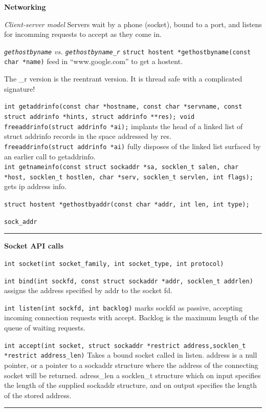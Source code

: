 \documentclass{article}
\begin{document}
\begin{multicols}{2}
  {\bf Networking}

  {\it Client-server model} Servers wait by a phone (socket), bound to a port,
  and listens for incomming requests to accept as they come in.

  {\it {\tt gethostbyname} vs. {\tt gethostbyname\_r}}
  {\tt struct hostent *gethostbyname(const char *name)} feed in
  ``www.google.com'' to get a hostent.

  The \_r version is the reentrant version. It is thread safe with a complicated
  signature!

  {\tt int getaddrinfo(const char *hostname, const char *servname,
  const struct addrinfo *hints, struct addrinfo **res);
  void freeaddrinfo(struct addrinfo *ai);} implants the head of a
  linked list of struct addrinfo records in the space addressed by
  res.\\
  {\tt freeaddrinfo(struct addrinfo *ai)} fully disposes of the linked list
  surfaced by an earlier call to getaddrinfo.\\
  {\tt int getnameinfo(const struct sockaddr *sa, socklen\_t salen,
  char *host, socklen\_t hostlen,
  char *serv, socklen\_t servlen, int flags);} gets ip address info.

  {\tt struct hostent *gethostbyaddr(const char *addr, int len, int type);}

  {\tt sock\_addr}

  \noindent\rule{4cm}{0.4pt}

  {\bf Socket API calls}

  {\tt int socket(int socket\_family, int socket\_type, int protocol)}

  {\tt int bind(int sockfd, const struct sockaddr *addr, socklen\_t addrlen)}
  assigns the address specified by addr to the socket fd.

  {\tt int listen(int sockfd, int backlog)} marks sockfd as passive, accepting
  incoming connection requests with accept. Backlog is the maximum length of the
  queue of waiting requests.

  {\tt int accept(int socket, struct sockaddr *restrict address,socklen\_t
  *restrict address\_len)} Takes a bound socket called in listen. address is a
  null pointer, or a pointer to a sockaddr structure where the address of the
  connecting socket will be returned. adress\_len a socklen\_t structure which on
  input specifies the length of the supplied sockaddr structure, and on output
  specifies the length of the stored address.

  \noindent\rule{4cm}{0.4pt}


\end{multicols}
\end{document}
